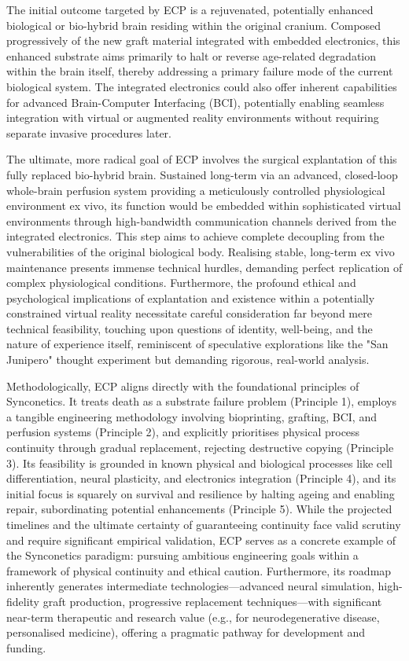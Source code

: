 \documentclass[10pt]{article}
\begin{document}
\begin{sloppypar}
  The initial outcome targeted by ECP is a rejuvenated, potentially enhanced biological or bio-hybrid brain residing within the original cranium. Composed progressively of the new graft material integrated with embedded electronics, this enhanced substrate aims primarily to halt or reverse age-related degradation within the brain itself, thereby addressing a primary failure mode of the current biological system. The integrated electronics could also offer inherent capabilities for advanced Brain-Computer Interfacing (BCI), potentially enabling seamless integration with virtual or augmented reality environments without requiring separate invasive procedures later.

  The ultimate, more radical goal of ECP involves the surgical explantation of this fully replaced bio-hybrid brain. Sustained long-term via an advanced, closed-loop whole-brain perfusion system providing a meticulously controlled physiological environment ex vivo, its function would be embedded within sophisticated virtual environments through high-bandwidth communication channels derived from the integrated electronics. This step aims to achieve complete decoupling from the vulnerabilities of the original biological body. Realising stable, long-term ex vivo maintenance presents immense technical hurdles, demanding perfect replication of complex physiological conditions. Furthermore, the profound ethical and psychological implications of explantation and existence within a potentially constrained virtual reality necessitate careful consideration far beyond mere technical feasibility, touching upon questions of identity, well-being, and the nature of experience itself, reminiscent of speculative explorations like the "San Junipero" thought experiment but demanding rigorous, real-world analysis.

  Methodologically, ECP aligns directly with the foundational principles of Synconetics. It treats death as a substrate failure problem (Principle 1), employs a tangible engineering methodology involving bioprinting, grafting, BCI, and perfusion systems (Principle 2), and explicitly prioritises physical process continuity through gradual replacement, rejecting destructive copying (Principle 3). Its feasibility is grounded in known physical and biological processes like cell differentiation, neural plasticity, and electronics integration (Principle 4), and its initial focus is squarely on survival and resilience by halting ageing and enabling repair, subordinating potential enhancements (Principle 5). While the projected timelines and the ultimate certainty of guaranteeing continuity face valid scrutiny and require significant empirical validation, ECP serves as a concrete example of the Synconetics paradigm: pursuing ambitious engineering goals within a framework of physical continuity and ethical caution. Furthermore, its roadmap inherently generates intermediate technologies—advanced neural simulation, high-fidelity graft production, progressive replacement techniques—with significant near-term therapeutic and research value (e.g., for neurodegenerative disease, personalised medicine), offering a pragmatic pathway for development and funding.


\end{sloppypar}
\end{document}
